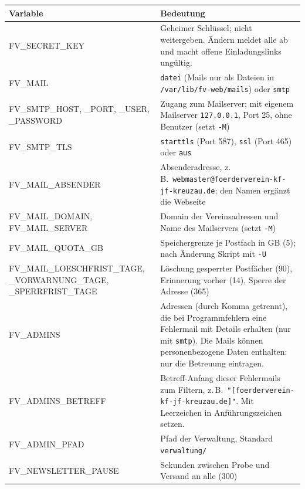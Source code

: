 \documentclass[a4paper,fontsize=10pt]{scrartcl}
\newcommand*{\cmd}[1]{\texttt{#1}}
\newcommand*{\pfad}[1]{\texttt{#1}}
\begin{document}
\begin{center}
\small
\begin{tabularx}{\textwidth}{@{}>{\ttfamily\raggedright}p{52mm}X@{}}
\toprule
\textbf{\sffamily Variable} & \textbf{Bedeutung} \\
\midrule
FV\_SECRET\_KEY            & Geheimer Schlüssel; nicht weitergeben. Ändern meldet alle ab
                             und macht offene Einladungslinks ungültig. \\
FV\_MAIL                   & \cmd{datei} (Mails nur als Dateien in \pfad{/var/lib/fv-web/mails})
                             oder \cmd{smtp} \\
FV\_SMTP\_HOST, \_PORT, \_USER, \_PASSWORD & Zugang zum Mailserver; mit eigenem
                             Mailserver \cmd{127.0.0.1}, Port 25, ohne Benutzer (setzt \cmd{-M}) \\
FV\_SMTP\_TLS              & \cmd{starttls} (Port 587), \cmd{ssl} (Port 465) oder \cmd{aus} \\
FV\_MAIL\_ABSENDER         & Absenderadresse, z.\,B.\ \cmd{webmaster@foerderverein-kf-jf-kreuzau.de};
                             den Namen ergänzt die Webseite \\
FV\_MAIL\_DOMAIN, FV\_MAIL\_SERVER & Domain der Vereinsadressen und Name des Mailservers
                             (setzt \cmd{-M}) \\
FV\_MAIL\_QUOTA\_GB        & Speichergrenze je Postfach in GB (5); nach Änderung Skript mit \cmd{-U} \\
FV\_MAIL\_LOESCHFRIST\_TAGE, \_VORWARNUNG\_TAGE, \_SPERRFRIST\_TAGE & Löschung gesperrter
                             Postfächer (90), Erinnerung vorher (14), Sperre der Adresse (365) \\
FV\_ADMINS                 & Adressen (durch Komma getrennt), die bei Programmfehlern eine
                             Fehlermail mit Details erhalten (nur mit \cmd{smtp}). Die Mails
                             können personenbezogene Daten enthalten: nur die Betreuung eintragen. \\
FV\_ADMINS\_BETREFF        & Betreff-Anfang dieser Fehlermails zum Filtern, z.\,B.\
                             \cmd{"[foerderverein-kf-jf-kreuzau.de]"}. Mit Leerzeichen in
                             Anführungszeichen setzen. \\
FV\_ADMIN\_PFAD            & Pfad der Verwaltung, Standard \cmd{verwaltung/} \\
FV\_NEWSLETTER\_PAUSE      & Sekunden zwischen Probe und Versand an alle (300) \\

\end{tabularx}
\end{center}
\end{document}
